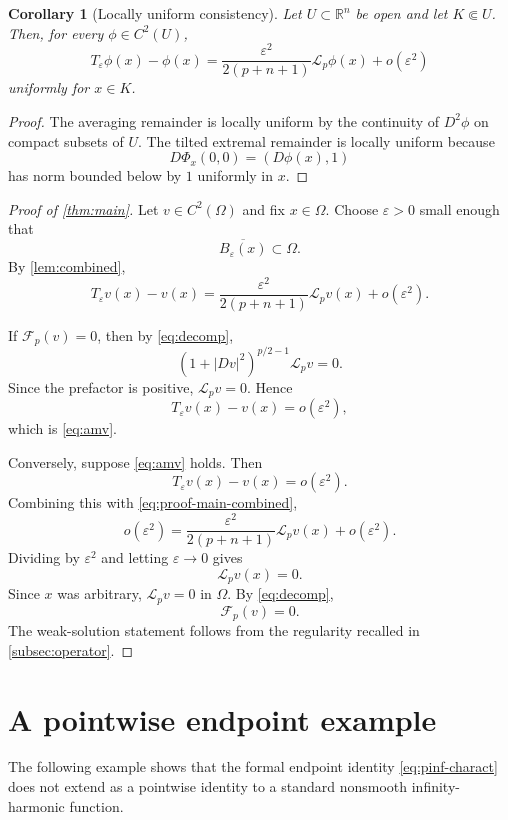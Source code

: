 \documentclass[12pt,reqno]{amsart}
\numberwithin{equation}{section}
\theoremstyle{plain}
\newtheorem{corollary}[corollary]{Corollary}
\theoremstyle{definition}
\theoremstyle{remark}
\newcommand{\R}{\mathbb{R}}
\newcommand{\Reg}{\mathcal{F}}
\newcommand{\Lp}{\mathcal L_p}
\begin{document}
\begin{corollary}[Locally uniform consistency]
\label{cor:uniform-consistency}
Let $U\subset\R^n$ be open and let $K\Subset U$. Then, for every
$\phi\in C^2(U)$,
\[
  T_\varepsilon\phi(x)-\phi(x)
  =
  \frac{\varepsilon^2}{2(p+n+1)}
  \Lp\phi(x)
  +
  o(\varepsilon^2)
\]
uniformly for $x\in K$.
\end{corollary}

\begin{proof}
The averaging remainder is locally uniform by the continuity of
$D^2\phi$ on compact subsets of $U$. The tilted extremal remainder is
locally uniform because
\[
  D\Phi_x(0,0)=(D\phi(x),1)
\]
has norm bounded below by $1$ uniformly in $x$.
\end{proof}

\begin{proof}[Proof of \cref{thm:main}]
Let $v\in C^2(\Omega)$ and fix $x\in\Omega$. Choose $\varepsilon>0$ small
enough that
\[
  \overline{B_\varepsilon(x)}\subset\Omega.
\]
By \cref{lem:combined},
\begin{equation}\label{eq:proof-main-combined}
  T_\varepsilon v(x)-v(x)
  =
  \frac{\varepsilon^2}{2(p+n+1)}
  \Lp v(x)
  +
  o(\varepsilon^2).
\end{equation}

If $\Reg_p(v)=0$, then by \eqref{eq:decomp},
\[
  (1+|Dv|^2)^{p/2-1}\Lp v=0.
\]
Since the prefactor is positive, $\Lp v=0$. Hence
\[
  T_\varepsilon v(x)-v(x)=o(\varepsilon^2),
\]
which is \eqref{eq:amv}.

Conversely, suppose \eqref{eq:amv} holds. Then
\[
  T_\varepsilon v(x)-v(x)=o(\varepsilon^2).
\]
Combining this with \eqref{eq:proof-main-combined},
\[
  o(\varepsilon^2)
  =
  \frac{\varepsilon^2}{2(p+n+1)}
  \Lp v(x)
  +
  o(\varepsilon^2).
\]
Dividing by $\varepsilon^2$ and letting $\varepsilon\to0$ gives
\[
  \Lp v(x)=0.
\]
Since $x$ was arbitrary, $\Lp v=0$ in $\Omega$. By \eqref{eq:decomp},
\[
  \Reg_p(v)=0.
\]
The weak-solution statement follows from the regularity recalled in
\cref{subsec:operator}.
\end{proof}

\section{A pointwise endpoint example}
\label{sec:endpoint}

The following example shows that the formal endpoint identity
\eqref{eq:pinf-charact} does not extend as a pointwise identity to a
standard nonsmooth infinity-harmonic function.
\end{document}
